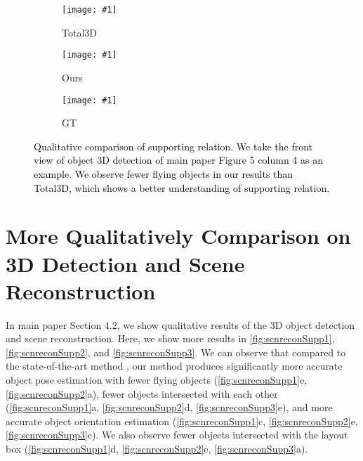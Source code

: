 \documentclass[final]{cvpr}
\newcommand{\zc}[1]{\textcolor{black}{{#1}}}
\let\orgautoref\autoref
\renewcommand{\autoref}[1]{\def\figureautorefname{Fig.}\orgautoref{#1}}
\begin{document}
\begin{figure}[!ht]
\centering
	\newcommand{\front}[1]{\texttt{[image: \#1]}}
	\begin{subfigure}[t]{0.155\textwidth}
		\front{figure/scnreconRebuttal/Total3D/276_front_3d}
		\vspace{-2em}
		\caption{Total3D}
	\end{subfigure}
	\begin{subfigure}[t]{0.155\textwidth}
		\front{figure/scnreconRebuttal/ours/276_front_3d}
		\vspace{-2em}
		\caption{Ours}
	\end{subfigure}
	\begin{subfigure}[t]{0.155\textwidth}
		\front{figure/scnreconRebuttal/gt/276_front_3d}
		\vspace{-2em}
		\caption{GT}
	\end{subfigure}
	\vspace{-1em}
	\caption{\zc{Qualitative comparison of supporting relation.
	We take the front view of object 3D detection of main paper Figure 5 column 4 as an example. 
	We observe fewer flying objects in our results than Total3D, which shows a better understanding of supporting relation.
	}}
	\label{fig:sup_qualitative}
\end{figure}


\section{More Qualitatively Comparison on 3D Detection and Scene Reconstruction}
In main paper Section 4.2, we show qualitative results of the 3D object detection and scene reconstruction.
Here, we show more results in \autoref{fig:scnreconSupp1}, \autoref{fig:scnreconSupp2}, and \autoref{fig:scnreconSupp3}.
We can observe that compared to the state-of-the-art method \cite{nie2020total3dunderstanding}, our method produces significantly more accurate object pose estimation with fewer flying objects (\autoref{fig:scnreconSupp1}e, \autoref{fig:scnreconSupp2}a), fewer objects intersected with each other (\autoref{fig:scnreconSupp1}a, \autoref{fig:scnreconSupp2}d, \autoref{fig:scnreconSupp3}e), and more accurate object orientation estimation (\autoref{fig:scnreconSupp1}c, \autoref{fig:scnreconSupp2}e, \autoref{fig:scnreconSupp3}c). We also observe fewer objects intersected with the layout box (\autoref{fig:scnreconSupp1}d, \autoref{fig:scnreconSupp2}e, \autoref{fig:scnreconSupp3}a). 
\end{document}
